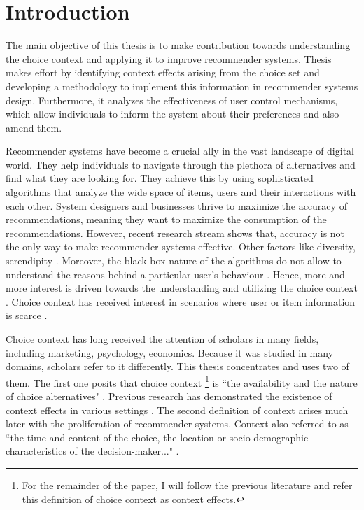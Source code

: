 \documentclass[a4paper,12pt]{article}
\begin{document}
\section{Introduction}


The main objective of this thesis is to make contribution towards understanding the choice context and applying it to improve recommender systems. Thesis makes effort by identifying context effects arising from the choice set and developing a methodology to implement this information in recommender systems design. Furthermore, it analyzes the effectiveness of user control mechanisms, which allow individuals to inform the system about their preferences and also amend them.

Recommender systems have become a crucial ally in the vast landscape of digital world. They help individuals to navigate through the plethora of alternatives and find what they are looking for. They achieve this by using sophisticated algorithms that analyze the wide space of items, users and their interactions with each other. System designers and businesses thrive to maximize the accuracy of recommendations, meaning they want to maximize the consumption of the recommendations. However, recent research stream shows that, accuracy is not the only way to make recommender systems effective. Other factors like diversity, serendipity \citep{kaminskas2016diversity}. Moreover, the black-box nature of the algorithms do not allow to understand the reasons behind a particular user's behaviour \citep{kotkovSurveySerendipityRecommender2016, samih2021exmrec2vec}. Hence, more and more interest is driven towards the understanding and utilizing the choice context \citep{adomavicius2005toward}. Choice context has received interest in scenarios where user or item information is scarce \citep{scheinMethodsMetricsColdStart}.  

Choice context has long received the attention of scholars in many fields, including marketing, psychology, economics. Because it was studied in many domains, scholars refer to it differently. This thesis concentrates and uses two of them. The first one posits that choice context \footnote{For the remainder of the paper, I will follow the previous literature \citep{truebloodEtAl13} and refer this definition of choice context as context effects.} is ``the availability and the nature of choice alternatives" \citep{tversky1972elimination, huberEtAl82, simonson89}. Previous research has demonstrated the existence of context effects in various settings \citep{herne1997decoy, soltani2012range, evangelidisEtAl18,  wuConsguner20}. The second definition of context arises much later with the proliferation of recommender systems. Context also referred to as ``the time and content of the choice, the location or socio-demographic characteristics of the decision-maker..." \citep{adomavicius2011context}. 
\end{document}
